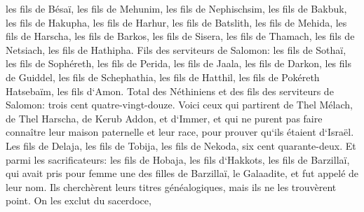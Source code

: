 \verse les fils de Bésaï, les fils de Mehunim, les fils de Nephischsim, 
\verse les fils de Bakbuk, les fils de Hakupha, les fils de Harhur, 
\verse les fils de Batslith, les fils de Mehida, les fils de Harscha, 
\verse les fils de Barkos, les fils de Sisera, les fils de Thamach, 
\verse les fils de Netsiach, les fils de Hathipha. 
\verse Fils des serviteurs de Salomon: les fils de Sothaï, les fils de Sophéreth, les fils de Perida, 
\verse les fils de Jaala, les fils de Darkon, les fils de Guiddel, 
\verse les fils de Schephathia, les fils de Hatthil, les fils de Pokéreth Hatsebaïm, les fils d`Amon. 
\verse Total des Néthiniens et des fils des serviteurs de Salomon: trois cent quatre-vingt-douze. 
\verse Voici ceux qui partirent de Thel Mélach, de Thel Harscha, de Kerub Addon, et d`Immer, et qui ne purent pas faire connaître leur maison paternelle et leur race, pour prouver qu`ils étaient d`Israël. 
\verse Les fils de Delaja, les fils de Tobija, les fils de Nekoda, six cent quarante-deux. 
\verse Et parmi les sacrificateurs: les fils de Hobaja, les fils d`Hakkots, les fils de Barzillaï, qui avait pris pour femme une des filles de Barzillaï, le Galaadite, et fut appelé de leur nom. 
\verse Ils cherchèrent leurs titres généalogiques, mais ils ne les trouvèrent point. On les exclut du sacerdoce, 
